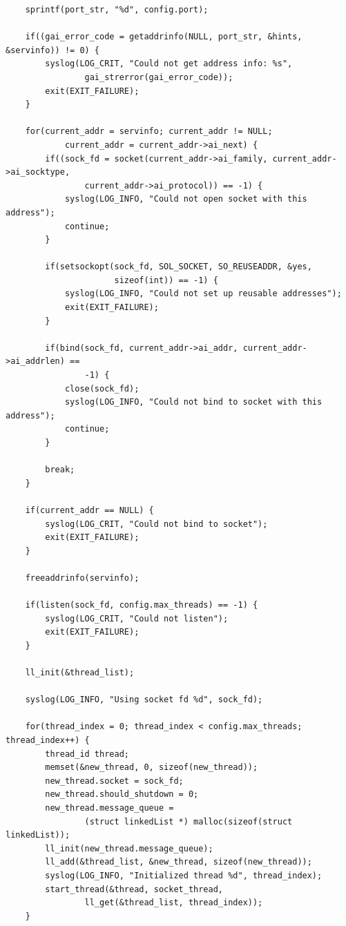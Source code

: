 \documentclass{article}
\begin{document}
\begin{verbatim}
    sprintf(port_str, "%d", config.port);
    
    if((gai_error_code = getaddrinfo(NULL, port_str, &hints, &servinfo)) != 0) {
        syslog(LOG_CRIT, "Could not get address info: %s",
                gai_strerror(gai_error_code));
        exit(EXIT_FAILURE);
    }
    
    for(current_addr = servinfo; current_addr != NULL;
            current_addr = current_addr->ai_next) {
        if((sock_fd = socket(current_addr->ai_family, current_addr->ai_socktype,
                current_addr->ai_protocol)) == -1) {
            syslog(LOG_INFO, "Could not open socket with this address");
            continue;
        }
        
        if(setsockopt(sock_fd, SOL_SOCKET, SO_REUSEADDR, &yes,
                      sizeof(int)) == -1) {
            syslog(LOG_INFO, "Could not set up reusable addresses");
            exit(EXIT_FAILURE);
        }
        
        if(bind(sock_fd, current_addr->ai_addr, current_addr->ai_addrlen) ==
                -1) {
            close(sock_fd);
            syslog(LOG_INFO, "Could not bind to socket with this address");
            continue;
        }
        
        break;
    }
    
    if(current_addr == NULL) {
        syslog(LOG_CRIT, "Could not bind to socket");
        exit(EXIT_FAILURE);
    }
    
    freeaddrinfo(servinfo);
    
    if(listen(sock_fd, config.max_threads) == -1) {
        syslog(LOG_CRIT, "Could not listen");
        exit(EXIT_FAILURE);
    }
    
    ll_init(&thread_list);
    
    syslog(LOG_INFO, "Using socket fd %d", sock_fd);
    
    for(thread_index = 0; thread_index < config.max_threads; thread_index++) {
        thread_id thread;
        memset(&new_thread, 0, sizeof(new_thread));
        new_thread.socket = sock_fd;
        new_thread.should_shutdown = 0;
        new_thread.message_queue =
                (struct linkedList *) malloc(sizeof(struct linkedList));
        ll_init(new_thread.message_queue);
        ll_add(&thread_list, &new_thread, sizeof(new_thread));
        syslog(LOG_INFO, "Initialized thread %d", thread_index);
        start_thread(&thread, socket_thread,
                ll_get(&thread_list, thread_index));
    }
    

\end{verbatim}
\end{document}
